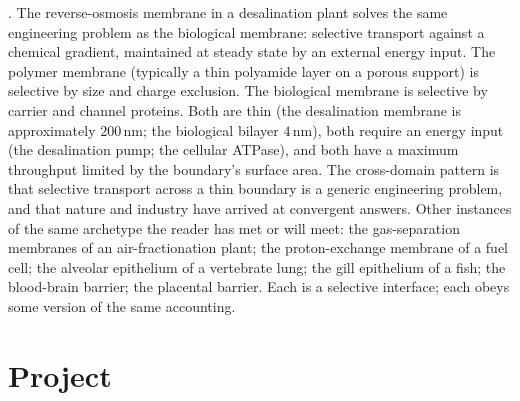 . The reverse-osmosis membrane in a
desalination plant solves the same engineering problem as the
biological membrane: selective transport against a chemical gradient,
maintained at steady state by an external energy input. The polymer
membrane (typically a thin polyamide layer on a porous support) is
selective by size and charge exclusion. The biological membrane is
selective by carrier and channel proteins. Both are thin (the
desalination membrane is approximately $200\,\text{nm}$; the
biological bilayer $4\,\text{nm}$), both require an energy input (the
desalination pump; the cellular ATPase), and both have a maximum
throughput limited by the boundary's surface area. The cross-domain
pattern is that selective transport across a thin boundary is a
generic engineering problem, and that nature and industry have arrived
at convergent answers. Other instances of the same archetype the
reader has met or will meet: the gas-separation membranes of an
air-fractionation plant; the proton-exchange membrane of a fuel cell;
the alveolar epithelium of a vertebrate lung; the gill epithelium of
a fish; the blood-brain barrier; the placental barrier. Each is a
selective interface; each obeys some version of the same accounting.

\section{Project}

